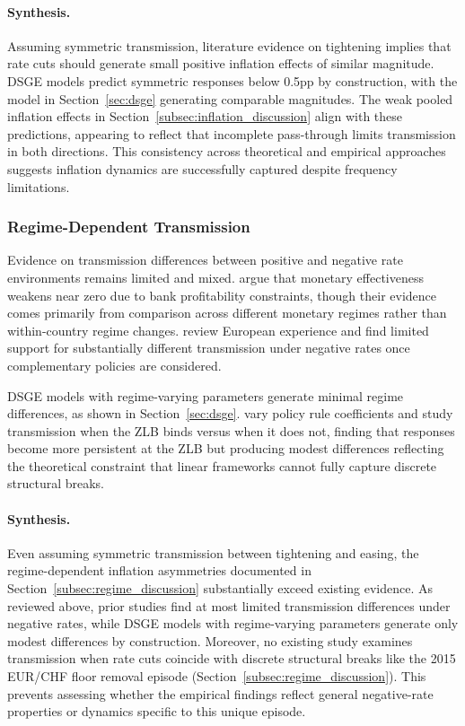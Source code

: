 \documentclass[12pt,a4paper]{article}
\begin{document}
\paragraph{Synthesis.}
Assuming symmetric transmission, literature evidence on tightening implies that rate cuts should generate small positive inflation effects of similar magnitude. DSGE models predict symmetric responses below 0.5pp by construction, with the model in Section~\ref{sec:dsge} generating comparable magnitudes. The weak pooled inflation effects in Section~\ref{subsec:inflation_discussion} align with these predictions, appearing to reflect that incomplete pass-through limits transmission in both directions. This consistency across theoretical and empirical approaches suggests inflation dynamics are successfully captured despite frequency limitations.

\subsubsection{Regime-Dependent Transmission}
Evidence on transmission differences between positive and negative rate 
environments remains limited and mixed. \citet{borio2017} argue that monetary 
effectiveness weakens near zero due to bank profitability constraints, though 
their evidence comes primarily from comparison across different monetary regimes rather than within-country regime changes. \citet{ecb2021} review European experience and find limited support for substantially different transmission under negative rates once complementary policies are considered. 

DSGE models with regime-varying parameters generate minimal regime differences, as shown in Section~\ref{sec:dsge}. \citet{baurle2014} vary policy rule coefficients and study transmission when the ZLB binds versus when it does not, finding that responses become more persistent at the ZLB but producing modest differences reflecting the theoretical constraint that linear frameworks cannot fully capture discrete structural breaks.

\paragraph{Synthesis.}
Even assuming symmetric transmission between tightening and easing, the regime-dependent inflation asymmetries documented in Section~\ref{subsec:regime_discussion} substantially exceed existing evidence. As reviewed above, prior studies find at most limited transmission differences under negative rates, while DSGE models with regime-varying parameters generate only modest differences by construction. Moreover, no existing study examines transmission when rate cuts coincide with discrete structural breaks like the 2015 EUR/CHF floor removal episode (Section~\ref{subsec:regime_discussion}). This prevents assessing whether the empirical findings reflect general negative-rate properties or dynamics specific to this unique episode.
\end{document}
